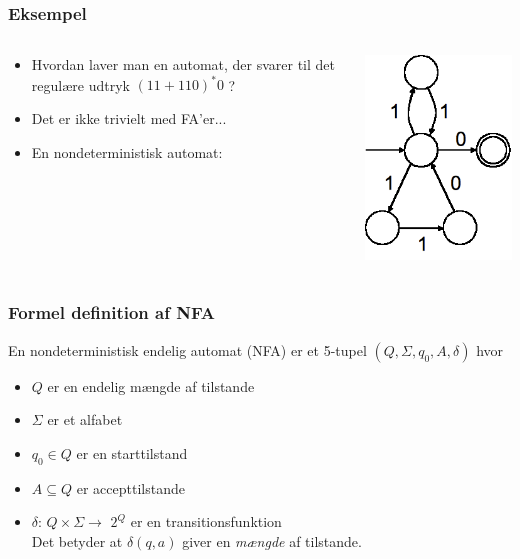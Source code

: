 \begin{frame}
\frametitle{Eksempel}

\begin{columns}
  \begin{column}{9cm}
    \begin{itemize}[<+->]
    \item Hvordan laver man en automat, der svarer til det regulære
      udtryk $(11 + 110)^*0$ ?

    \item Det er ikke trivielt med FA’er...

    \item En nondeterministisk automat:
    \end{itemize}
  \end{column}
\pause
  \begin{column}{5cm}
      \includegraphics[scale=0.4]{images/2_seminar_nondet}
  \end{column}
\end{columns}
\end{frame}
\begin{frame}
\frametitle{Formel definition af NFA}
En nondeterministisk endelig automat (NFA) er et 5-tupel $(Q, \Sigma, q_0, A, \delta)$ hvor
 
\begin{itemize}[<+->]
\item $Q$ er en endelig mængde af tilstande
\item $\Sigma$ er et alfabet
\item $q_0\in Q$ er en starttilstand
\item $A\subseteq Q$ er accepttilstande
\item $\delta$: $Q\times \Sigma \rightarrow$ \alert{$2^Q$} er en transitionsfunktion\\
  Det betyder at $\delta(q,a)$ giver en \emph{mængde} af tilstande.
\end{itemize}
\end{frame}
